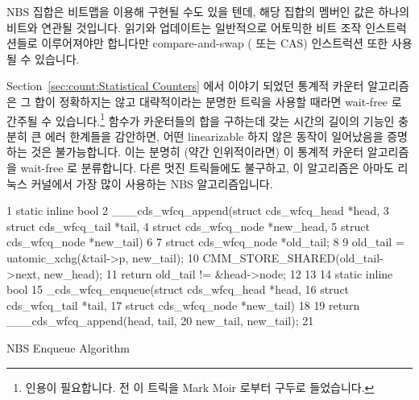 NBS 집합은 비트맵을 이용해 구현될 수도 있을 텐데, 해당 집합의 멤버인 값은
하나의 비트와 연관될 것입니다.
읽기와 업데이트는 일반적으로 어토믹한 비트 조작 인스트럭션들로 이루어져야만
합니다만 compare-and-swap ( 또는 CAS) 인스트럭션 또한 사용될 수
있습니다.

Section~\ref{sec:count:Statistical Counters} 에서 이야기 되었던 통계적 카운터
알고리즘은 그 합이 정확하지는 않고 대략적이라는 분명한 트릭을 사용할 때라면
wait-free 로 간주될 수 있습니다.\footnote{
	인용이 필요합니다.
	전 이 트릭을 Mark Moir 로부터 구두로 들었습니다.}
 함수가 카운터들의 합을 구하는데 갖는 시간의 길이의 기능인
충분히 큰 에러 한계들을 감안하면, 어떤 linearizable 하지 않은 동작이 일어났음을
증명하는 것은 불가능합니다.
이는 분명히 (약간 인위적이라면) 이 통계적 카운터 알고리즘을 wait-free 로
분류합니다.
다른 멋진 트릭들에도 불구하고, 이 알고리즘은 아마도 리눅스 커널에서 가장 많이
사용하는 NBS 알고리즘입니다.
\iffalse

An NBS set may also be implemented using a bitmap, where each value that
might be a member of the set corresponds to one bit.
Reads and updates must normally be carried out via atomic bit-manipulation
instructions, although compare-and-swap (\co{cmpxchg()} or CAS)
instructions can also be used.

The statistical counters algorithm discussed in
Section~\ref{sec:count:Statistical Counters}
can be considered wait-free, but only but using a cute definitional trick
in which the sum is considered approximate rather than exact.\footnote{
	Citation needed.
	I heard of this trick verbally from Mark Moir.}
Given sufficiently wide error bounds that are a function of the length
of time that the \co{read_count()} function takes to sum the counters,
it is not possible to prove that any non-linearizable behavior occurred.
This definitely (if a bit artificially) classifies the statistical-counters
algorithm as wait-free.
Cute definitional tricks notwithstanding, this algorithm is probably
the most heavily used NBS algorithm in the Linux kernel.
\fi

\begin{listing}[tbp]
{ \scriptsize
\begin{verbbox}
 1 static inline bool
 2 ___cds_wfcq_append(struct cds_wfcq_head *head,
 3                    struct cds_wfcq_tail *tail,
 4                    struct cds_wfcq_node *new_head,
 5                    struct cds_wfcq_node *new_tail)
 6 {
 7   struct cds_wfcq_node *old_tail;
 8 
 9   old_tail = uatomic_xchg(&tail->p, new_tail);
10   CMM_STORE_SHARED(old_tail->next, new_head);
11   return old_tail != &head->node;
12 }
13 
14 static inline bool
15 _cds_wfcq_enqueue(struct cds_wfcq_head *head,
16                   struct cds_wfcq_tail *tail,
17                   struct cds_wfcq_node *new_tail)
18 {
19   return ___cds_wfcq_append(head, tail,
20                             new_tail, new_tail);
21 }
\end{verbbox}
}
\centering
\theverbbox
\caption{NBS Enqueue Algorithm}
\label{lst:count:NBS Enqueue Algorithm}
\end{listing}

